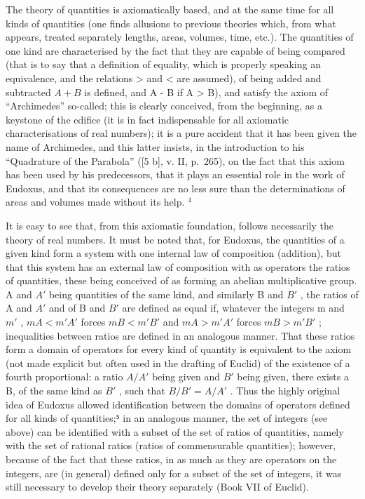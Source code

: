 \begin{enumerate}
  The theory of quantities is axiomatically based, and at the same time for all kinds of quantities (one finds allusions to previous theories which, from what appears, treated separately lengths, areas, volumes, time, etc.). The quantities of one kind are characterised by the fact that they are capable of being compared (that is to say that a definition of equality, which is properly speaking an equivalence, and the relations \textgreater{} and \textless{} are assumed), of being added and subtracted \(A + B\) is defined, and A - B if A \textgreater{} B), and satisfy the axiom of ``Archimedes'' so-called; this is clearly conceived, from the beginning, as a keystone of the edifice (it is in fact indispensable for all axiomatic characterisations of real numbers); it is a pure accident that it has been given the name of Archimedes, and this latter insists, in the introduction to his ``Quadrature of the Parabola'' ({[}5 b{]}, v. II, p.~265), on the fact that this axiom has been used by his predecessors, that it plays an essential role in the work of Eudoxus, and that its consequences are no less sure than the determinations of areas and volumes made without its help. \(^{4}\)
\end{enumerate}

It is easy to see that, from this axiomatic foundation, follows necessarily the theory of real numbers. It must be noted that, for Eudoxus, the quantities of a given kind form a system with one internal law of composition (addition), but that this system has an external law of composition with as operators the ratios of quantities, these being conceived of as forming an abelian multiplicative group. A and \(A'\) being quantities of the same kind, and similarly B and \(B'\) , the ratios of A and \(A'\) and of B and \(B'\) are defined as equal if, whatever the integers m and \(m'\) , \(mA < m'A'\) forces \(mB < m'B'\) and \(mA > m'A'\) forces \(mB > m'B'\) ; inequalities between ratios are defined in an analogous manner. That these ratios form a domain of operators for every kind of quantity is equivalent to the axiom (not made explicit but often used in the drafting of Euclid) of the existence of a fourth proportional: a ratio \(A/A'\) being given and \(B'\) being given, there exists a B, of the same kind as \(B'\) , such that \(B/B' = A/A'\) . Thus the highly original idea of Eudoxus allowed identification between the domains of operators defined for all kinds of quantities;⁵ in an analogous manner, the set of integers (see above) can be identified with a subset of the set of ratios of quantities, namely with the set of rational ratios (ratios of commensurable quantities); however, because of the fact that these ratios, in as much as they are operators on the integers, are (in general) defined only for a subset of the set of integers, it was still necessary to develop their theory separately (Book VII of Euclid).

